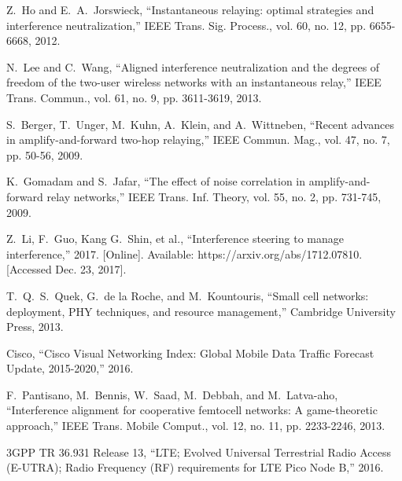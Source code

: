 \documentclass[10pt, conference, letterpaper]{IEEEtran}
\begin{document}
\begin{thebibliography}{1}
Z.~Ho and E.~A.~Jorswieck, ``Instantaneous relaying: optimal strategies and interference neutralization,'' IEEE Trans. Sig. Process., vol. 60, no. 12, pp. 6655-6668, 2012.

N.~Lee and C.~Wang, ``Aligned interference neutralization and the degrees of freedom of the two-user wireless networks with an instantaneous relay,'' IEEE Trans. Commun., vol. 61, no. 9, pp. 3611-3619, 2013.

S.~Berger, T.~Unger, M.~Kuhn, A.~Klein, and A.~Wittneben, ``Recent advances in amplify-and-forward two-hop relaying,'' IEEE Commun. Mag., vol. 47, no. 7, pp. 50-56, 2009.

K.~Gomadam and S.~Jafar, ``The effect of noise correlation in amplify-and-forward relay networks,'' IEEE Trans. Inf. Theory, vol. 55, no. 2, pp. 731-745, 2009.

Z.~Li, F.~Guo, Kang G.~Shin, et al., ``Interference steering to manage interference,'' 2017. [Online].
Available: https://arxiv.org/abs/1712.07810. [Accessed Dec. 23, 2017].

T.~Q.~S.~Quek, G.~de la Roche, and M.~Kountouris, ``Small cell networks: deployment, PHY techniques, and resource management,'' Cambridge University Press, 2013.

Cisco, ``Cisco Visual Networking Index: Global Mobile Data Traffic Forecast Update, 2015-2020,'' 2016.

F.~Pantisano, M.~Bennis, W.~Saad, M.~Debbah, and M.~Latva-aho, ``Interference alignment for cooperative femtocell networks: A game-theoretic approach,''
IEEE Trans. Mobile Comput., vol. 12, no. 11, pp. 2233-2246, 2013.

3GPP TR 36.931 Release 13, ``LTE; Evolved Universal Terrestrial Radio Access (E-UTRA); Radio Frequency (RF) requirements for LTE Pico Node B,'' 2016.

\end{thebibliography}




\end{document}

